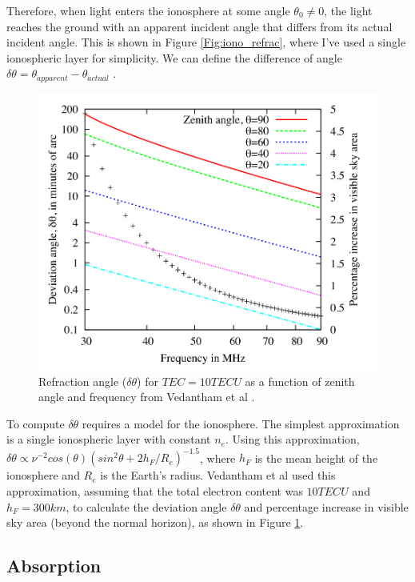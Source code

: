 Therefore, when light enters the ionosphere at some angle $\theta_0 \neq 0$, the light reaches the ground with an apparent incident angle that differs from its actual incident angle. This is shown in Figure \ref{Fig:iono_refrac}, where I've used a single ionospheric layer for simplicity. We can define the difference of angle $\delta \theta = \theta_{apparent}-\theta_{actual}$ \cite{thompson_2001}.


\begin{figure}[htb]
\begin{center}
\includegraphics[width=0.95\linewidth]{Ionosphere/figures/refraction_impact.jpg}
\caption{Refraction angle ($\delta \theta$) for $TEC= 10 TECU$ as a function of zenith angle and frequency from Vedantham et al \cite{vedantham_2014}.}
\label{Fig:refrac_est}
\end{center}
\end{figure} 

To compute $\delta \theta$ requires a model for the ionosphere. The simplest approximation is a single ionospheric layer with constant $n_e$. Using this approximation, $\delta \theta \propto \nu^{-2} cos(\theta)(sin^2 \theta + 2 h_F/R_e)^{-1.5}$, where $h_F$ is the mean height of the ionosphere and $R_e$ is the Earth's radius. Vedantham et al \cite{vedantham_2014} used this approximation, assuming that the total electron content was $10 TECU$ and $h_F = 300 km$, to calculate the deviation angle $\delta \theta$ and percentage increase in visible sky area (beyond the normal horizon), as shown in Figure \ref{Fig:refrac_est}. 


\subsection{Absorption}

